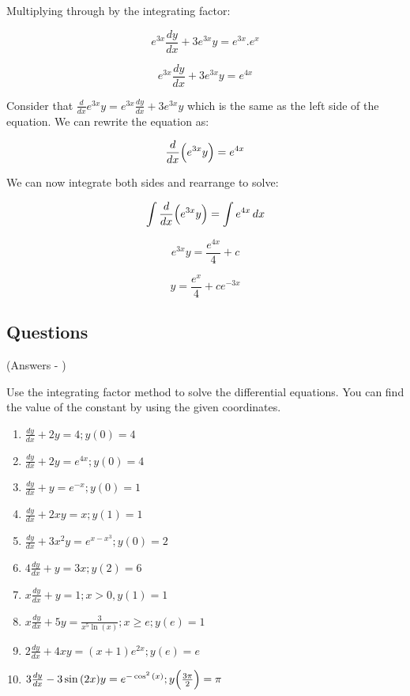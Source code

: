 \documentclass[../main.tex]{subfiles}
\begin{document}
Multiplying through by the integrating factor:

\[e^{3x}\frac{dy}{dx}+3e^{3x}y=e^{3x}.e^x\]

\[e^{3x}\frac{dy}{dx}+3e^{3x}y=e^{4x}\]

Consider that $\frac{d}{dx}e^{3x}y=e^{3x}\frac{dy}{dx}+3e^{3x}y$ which is the same as the left side of the equation. We can rewrite the equation as:

\[\frac{d}{dx}\Bigl(e^{3x}y\Bigr)=e^{4x}\]

We can now integrate both sides and rearrange to solve:

\[\int \frac{d}{dx}\Bigl(e^{3x}y\Bigr)=\int e^{4x}\,dx\]

\[e^{3x}y=\frac{e^{4x}}{4}+c\]

\[y=\frac{e^x}{4}+ce^{-3x}\]

\pagebreak

\subsection*{Questions}
(Answers - {\pageref{Integrating factor answers}})
\label{Integrating factor method}

Use the integrating factor method to solve the differential equations. You can find the value of the constant by using the given coordinates.
\begin{enumerate}[itemsep=0.7cm]
    \item 
    $\frac{dy}{dx}+2y=4; y(0)=4$

    \item 
    $\frac{dy}{dx}+2y=e^{4x}; y(0)=4$

    \item 
    $\frac{dy}{dx}+y=e^{-x}; y(0)=1$

    \item 
    $\frac{dy}{dx}+2xy=x; y(1)=1$

    \item 
    $\frac{dy}{dx}+3x^2 y=e^{x-x^3}; y(0)=2$

    \item 
    $4\frac{dy}{dx}+y=3x; y(2)=6$

    \item 
    $x\frac{dy}{dx}+y=1; x>0, y(1)=1$

    \item 
    $x\frac{dy}{dx}+5y=\frac{3}{x^5 \ln{(x)}}; x\geq e; y(e)=1$

    \item 
    $2\frac{dy}{dx}+4xy=(x+1)e^{2x}; y(e)=e$

    \item 
    $3\frac{dy}{dx}-3\sin{(2x)}y=e^{-\cos^2{(x)}}; y\Bigl(\frac{3\pi}{2}\Bigr)=\pi$



\end{enumerate}
\end{document}
